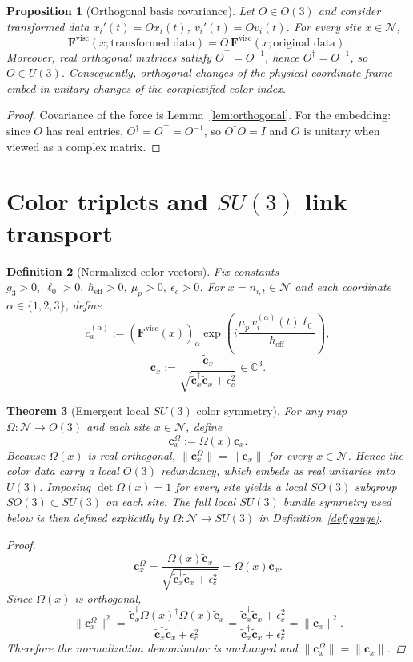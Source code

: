 \documentclass[11pt]{article}
\newtheorem{theorem}{Theorem}[section]
\newtheorem{definition}[theorem]{Definition}
\newtheorem{proposition}[theorem]{Proposition}
\theoremstyle{remark}
\newcommand{\C}{\mathbb C}
\newcommand{\mcN}{\mathcal N}
\begin{document}
\begin{proposition}[Orthogonal basis covariance]
\label{thm:viscous-su3}
Let $O\in O(3)$ and consider transformed data
$x_i'(t)=Ox_i(t)$, $v_i'(t)=Ov_i(t)$.
For every site $x\in\mcN$,
\[
\mathbf F^{\mathrm{visc}}(x;\text{transformed data})=O\,\mathbf F^{\mathrm{visc}}(x;\text{original data}).
\]
Moreover, real orthogonal matrices satisfy $O^\top=O^{-1}$, hence $O^\dagger=O^{-1}$,
so $O\in U(3)$.
Consequently, orthogonal changes of the physical coordinate frame embed in
unitary changes of the complexified color index.
\end{proposition}
\begin{proof}
Covariance of the force is Lemma~\ref{lem:orthogonal}.
For the embedding: since $O$ has real entries, $O^\dagger=O^\top=O^{-1}$,
so $O^\dagger O=I$ and $O$ is unitary when viewed as a complex matrix.
\end{proof}

\section{Color triplets and $SU(3)$ link transport}
\label{sec:su3}

\begin{definition}[Normalized color vectors]
\label{def:colors}
Fix constants $g_3>0,\ \ell_0>0,\ \hbar_{\mathrm{eff}}>0,\ \mu_p>0,\ \epsilon_c>0$.
For $x=n_{i,t}\in\mcN$ and each coordinate $\alpha\in\{1,2,3\}$, define
\[
\tilde c_x^{(\alpha)}:=(\mathbf F^{\mathrm{visc}}(x))_\alpha
\exp\!\left(i\frac{\mu_p\,v_i^{(\alpha)}(t)\ell_0}{\hbar_{\mathrm{eff}}}\right),
\]
\[
\mathbf c_x:=\frac{\tilde{\mathbf c}_x}{\sqrt{\tilde{\mathbf c}_x^\dagger\tilde{\mathbf c}_x+\epsilon_c^2}}\in\C^3.
\]
\end{definition}

\begin{theorem}[Emergent local $SU(3)$ color symmetry]
\label{thm:viscous-su3-local}
For any map $\Omega:\mcN\to O(3)$ and each site $x\in\mcN$, define
\[
\mathbf c_x^\Omega:=\Omega(x)\mathbf c_x.
\]
Because $\Omega(x)$ is real orthogonal, $\|\mathbf c_x^\Omega\|=\|\mathbf c_x\|$ for every
$x\in\mcN$.
Hence the color data carry a local $O(3)$ redundancy, which embeds as real
unitaries into $U(3)$.
Imposing $\det\Omega(x)=1$ for every site yields a local $SO(3)$ subgroup
$SO(3)\subset SU(3)$ on each site.
The full local $SU(3)$ bundle symmetry used below is then defined explicitly by
$\Omega:\mcN\to SU(3)$ in Definition~\ref{def:gauge}.
\begin{proof}
\[
\mathbf c_x^\Omega
=\frac{\Omega(x)\tilde{\mathbf c}_x}
{\sqrt{\tilde{\mathbf c}_x^\dagger\tilde{\mathbf c}_x+\epsilon_c^2}}
=\Omega(x)\mathbf c_x.
\]
Since $\Omega(x)$ is orthogonal,
\[
\|\mathbf c_x^\Omega\|^2
=\frac{\tilde{\mathbf c}_x^\dagger\Omega(x)^\dagger\Omega(x)\tilde{\mathbf c}_x}
{\tilde{\mathbf c}_x^\dagger\tilde{\mathbf c}_x+\epsilon_c^2}
=\frac{\tilde{\mathbf c}_x^\dagger\tilde{\mathbf c}_x+\epsilon_c^2}
{\tilde{\mathbf c}_x^\dagger\tilde{\mathbf c}_x+\epsilon_c^2}
=\|\mathbf c_x\|^2.
\]
Therefore the normalization denominator is unchanged and
$\|\mathbf c_x^\Omega\|=\|\mathbf c_x\|$.
\end{proof}
\end{theorem}
\end{document}
